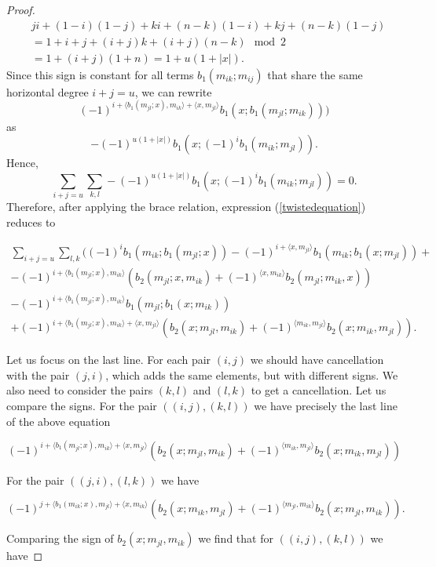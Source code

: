 \documentclass[Thesis.tex]{subfiles}
\begin{document}
\begin{proof}
\begin{align*}
&ji+(1-i)(1-j)+ki+(n-k)(1-i)+kj+(n-k)(1-j)\\
&= 1+i+j + (i+j)k+(i+j)(n-k)\mod 2\\
&=1+(i+j)(1+n)=1+u(1+|x|).
\end{align*}
Since this sign is constant for all terms $b_1(m_{ik};m_{ij})$ that share the same horizontal degree $i+j=u$, we can rewrite
\[(-1)^{i+\langle b_1(m_{jl};x),m_{ik}\rangle+\langle x,m_{jl}\rangle}b_1(x;b_1(m_{jl};m_{ik})))\]
as \[-(-1)^{u(1+|x|)}b_1(x;(-1)^ib_1(m_{ik};m_{jl})).\]
Hence, 
\[\sum_{i+j=u}\sum_{k,l}-(-1)^{u(1+|x|)}b_1(x;(-1)^ib_1(m_{ik};m_{jl}))=0.\]
Therefore, after applying the brace relation, expression (\ref{twistedequation}) reduces to

\begin{align}\label{twistedequation2}
\sum_{i+j=u}\sum_{l,k}((-1)^ib_1(m_{ik}; b_1(m_{jl};x))-(-1)^{i+\langle x,m_{jl}\rangle}b_1(m_{ik};b_1(x;m_{jl}))+\nonumber\\
 -(-1)^{i+\langle b_1(m_{jl};x),m_{ik}\rangle}(b_2(m_{jl};x,m_{ik})+(-1)^{\langle x,m_{ik}\rangle}b_2(m_{jl};m_{ik},x))\nonumber\\
 -(-1)^{i+\langle b_1(m_{jl};x),m_{ik}\rangle}b_1(m_{jl};b_1(x;m_{ik}))\nonumber\\
+(-1)^{i+\langle b_1(m_{jl};x),m_{ik}\rangle+\langle x,m_{jl}\rangle}(b_2(x;m_{jl},m_{ik})+(-1)^{\langle m_{ik},m_{jl}\rangle}b_2(x;m_{ik},m_{jl})).
\end{align}

Let us focus on the last line. For each pair $(i,j)$ we should have cancellation with the pair $(j,i)$, which adds the same elements, but with different signs. We also need to consider the pairs $(k,l)$ and $(l,k)$ to get a cancellation. Let us compare the signs. For the pair $((i,j),(k,l))$ we have precisely the last line of the above equation

\[(-1)^{i+\langle b_1(m_{jl};x),m_{ik}\rangle+\langle x,m_{jl}\rangle}(b_2(x;m_{jl},m_{ik})+(-1)^{\langle m_{ik},m_{jl}\rangle}b_2(x;m_{ik},m_{jl}))\]

For the pair $((j,i),(l,k))$ we have

\[(-1)^{j+\langle b_1(m_{ik};x),m_{jl}\rangle+\langle x,m_{ik}\rangle}(b_2(x;m_{ik},m_{jl})+(-1)^{\langle m_{jl},m_{ik}\rangle}b_2(x;m_{jl},m_{ik})).\]

 Comparing the sign of $b_2(x;m_{jl},m_{ik})$ we find that for $((i,j),(k,l))$ we have


\end{proof}
\end{document}
